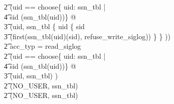 \documentclass[a4paper,pdftex]{article}
\begin{document}
\begin{axdef}
\t2   \ELSE (\LET uid == choose\{ uid: \dom ssn\_tbl | \\
\t4                      sid \in \dom (ssn\_tbl(uid))\} @ \\
\t3     (uid, ssn\_tbl \oplus \{ uid \mapsto \{ sid \mapsto \\
\t3     (first(ssn\_tbl(uid)(sid), refuse\_write\_siglog)) \} \} )) \\
\t2   \ELSE \IF  acc\_typ = read\_siglog \\
\t2   \THEN (\LET uid == choose\{ uid: \dom ssn\_tbl | \\
\t4                      sid \in \dom(ssn\_tbl(uid))\} @ \\
\t3     (uid, ssn\_tbl) ) \\
\t2   \ELSE  (NO\_USER, ssn\_tbl) \\
\t2   \ELSE  (NO\_USER, ssn\_tbl)\\
\end{axdef}
\end{document}
